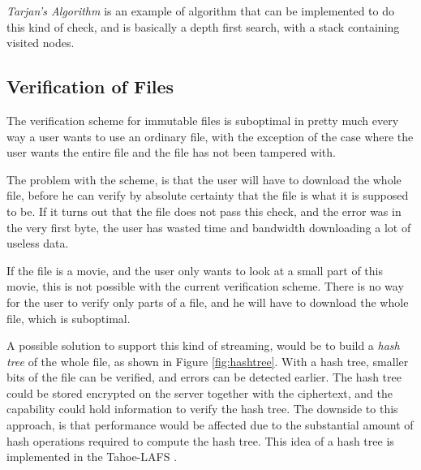 \documentclass[pdftex,english,10pt,b5paper,twoside]{book}
\begin{document}
\emph{Tarjan's Algorithm} \cite{tarjan} is an example of algorithm that can be
implemented to do this kind of check, and is basically a depth first search,
with a stack containing visited nodes.

\subsection{Verification of Files}

The verification scheme for immutable files is suboptimal in pretty much every
way a user wants to use an ordinary file, with the exception of the case where
the user wants the entire file and the file has not been tampered with.

The problem with the scheme, is that the user will have to download the whole
file, before he can verify by absolute certainty that the file is what it is
supposed to be. If it turns out that the file does not pass this check, and
the error was in the very first byte, the user has wasted time and bandwidth
downloading a lot of useless data.

If the file is a movie, and the user only wants to look at a
small part of this movie, this is not possible with the current verification
scheme. There is no way for the user to verify only parts of a
file, and he will have to download the whole file, which is suboptimal.

A possible solution to support this kind of streaming, would be to build a
\emph{hash tree} of the whole file, as shown in Figure \ref{fig:hashtree}. With
a hash tree, smaller bits of the file can be verified, and errors can be
detected earlier. The hash tree could be stored encrypted on the server
together with the ciphertext, and the capability could hold information to
verify the hash tree. The downside to this approach, is that performance would
be affected due to the substantial amount of hash operations required to
compute the hash tree. This idea of a hash tree is implemented in the
Tahoe-\ac{LAFS} \cite{tahoe}.
\end{document}
